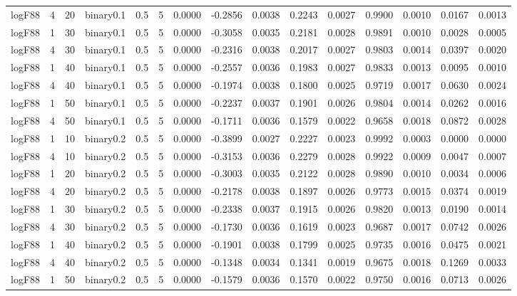 \begin{longtable}{rrrrrrrrrrrrrrr}
  logF88 & 4 & 20 & binary0.1 & 0.5 & 5 & 0.0000 & -0.2856 & 0.0038 & 0.2243 & 0.0027 & 0.9900 & 0.0010 & 0.0167 & 0.0013 \\ 
  logF88 & 1 & 30 & binary0.1 & 0.5 & 5 & 0.0000 & -0.3058 & 0.0035 & 0.2181 & 0.0028 & 0.9891 & 0.0010 & 0.0028 & 0.0005 \\ 
  logF88 & 4 & 30 & binary0.1 & 0.5 & 5 & 0.0000 & -0.2316 & 0.0038 & 0.2017 & 0.0027 & 0.9803 & 0.0014 & 0.0397 & 0.0020 \\ 
  logF88 & 1 & 40 & binary0.1 & 0.5 & 5 & 0.0000 & -0.2557 & 0.0036 & 0.1983 & 0.0027 & 0.9833 & 0.0013 & 0.0095 & 0.0010 \\ 
  logF88 & 4 & 40 & binary0.1 & 0.5 & 5 & 0.0000 & -0.1974 & 0.0038 & 0.1800 & 0.0025 & 0.9719 & 0.0017 & 0.0630 & 0.0024 \\ 
  logF88 & 1 & 50 & binary0.1 & 0.5 & 5 & 0.0000 & -0.2237 & 0.0037 & 0.1901 & 0.0026 & 0.9804 & 0.0014 & 0.0262 & 0.0016 \\ 
  logF88 & 4 & 50 & binary0.1 & 0.5 & 5 & 0.0000 & -0.1711 & 0.0036 & 0.1579 & 0.0022 & 0.9658 & 0.0018 & 0.0872 & 0.0028 \\ 
  logF88 & 1 & 10 & binary0.2 & 0.5 & 5 & 0.0000 & -0.3899 & 0.0027 & 0.2227 & 0.0023 & 0.9992 & 0.0003 & 0.0000 & 0.0000 \\ 
  logF88 & 4 & 10 & binary0.2 & 0.5 & 5 & 0.0000 & -0.3153 & 0.0036 & 0.2279 & 0.0028 & 0.9922 & 0.0009 & 0.0047 & 0.0007 \\ 
  logF88 & 1 & 20 & binary0.2 & 0.5 & 5 & 0.0000 & -0.3003 & 0.0035 & 0.2122 & 0.0028 & 0.9890 & 0.0010 & 0.0034 & 0.0006 \\ 
  logF88 & 4 & 20 & binary0.2 & 0.5 & 5 & 0.0000 & -0.2178 & 0.0038 & 0.1897 & 0.0026 & 0.9773 & 0.0015 & 0.0374 & 0.0019 \\ 
  logF88 & 1 & 30 & binary0.2 & 0.5 & 5 & 0.0000 & -0.2338 & 0.0037 & 0.1915 & 0.0026 & 0.9820 & 0.0013 & 0.0190 & 0.0014 \\ 
  logF88 & 4 & 30 & binary0.2 & 0.5 & 5 & 0.0000 & -0.1730 & 0.0036 & 0.1619 & 0.0023 & 0.9687 & 0.0017 & 0.0742 & 0.0026 \\ 
  logF88 & 1 & 40 & binary0.2 & 0.5 & 5 & 0.0000 & -0.1901 & 0.0038 & 0.1799 & 0.0025 & 0.9735 & 0.0016 & 0.0475 & 0.0021 \\ 
  logF88 & 4 & 40 & binary0.2 & 0.5 & 5 & 0.0000 & -0.1348 & 0.0034 & 0.1341 & 0.0019 & 0.9675 & 0.0018 & 0.1269 & 0.0033 \\ 
  logF88 & 1 & 50 & binary0.2 & 0.5 & 5 & 0.0000 & -0.1579 & 0.0036 & 0.1570 & 0.0022 & 0.9750 & 0.0016 & 0.0713 & 0.0026 \\ 

\end{longtable}
